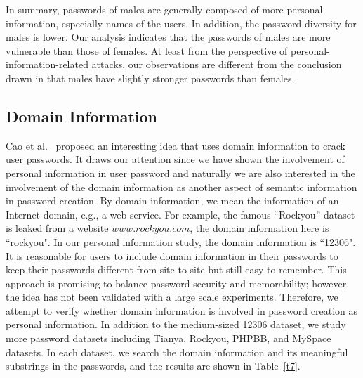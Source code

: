 In summary, passwords of males are generally composed of more personal
information, especially names of the users. In addition, the password
diversity for males is lower. Our analysis indicates that the
passwords of males are more vulnerable than those
of females. At least from the perspective of personal-information-related attacks, our observations are different from the conclusion drawn in \cite{mazurek2013measuring} that males have slightly stronger passwords than females.


\subsection{Domain Information} 
Cao et al.~\cite{cao2014personalized} proposed an interesting idea
that uses domain information to crack user passwords. It draws our
attention since we have shown the involvement of personal information
in user password and naturally we are also interested in the
involvement of the domain information as another aspect of semantic
information in password creation. By domain information, we mean the
information of an Internet domain, e.g., a web service. For example,
the famous ``Rockyou'' dataset is leaked from a website
$www.rockyou.com$, the domain information here is ``rockyou". In our
personal information study, the domain information is ``12306". It is
reasonable for users to include domain information in their passwords
to keep their passwords different from site to site but still easy to
remember. This approach is promising to balance password security and
memorability; however, the idea has not been validated with a large
scale experiments. Therefore, we attempt to verify whether domain
information is involved in password creation as personal
information. In addition to the medium-sized 12306 dataset, we study
more password datasets including Tianya, Rockyou, PHPBB, and MySpace
datasets. In each dataset, we search the domain information and its meaningful substrings in the
passwords, and the results are shown in Table~\ref{t7}.

